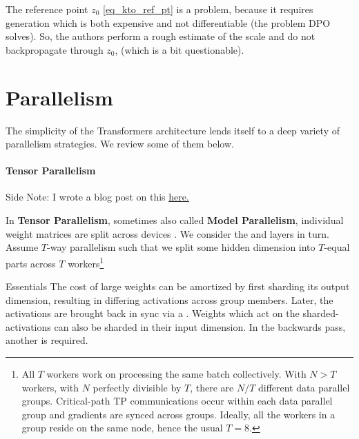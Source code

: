 \documentclass[11pt]{article}
\begin{document}
The reference point $ z _{ 0 } $ \eqref{eq_kto_ref_pt} is a problem, because it requires generation
which is both expensive and not differentiable (the problem DPO solves). So, the authors perform a
rough estimate of the scale and do not backpropagate through $ z _{ 0 } $, (which is a bit
questionable).


\newpage
\part{Parallelism}

The simplicity of the Transformers architecture lends itself to a deep variety of parallelism
strategies. We review some of them below.

\subsection{Tensor Parallelism \label{subsec_tensor_parallelism} }

\begin{commentbox}{Side Note: }
    I wrote a blog post on this \href{https://www.determined.ai/blog/tp}{here.}
\end{commentbox}


In \textbf{Tensor Parallelism}, sometimes also called \textbf{Model Parallelism}, individual weight
matrices are split across devices \cite{shoeybi2020megatronlm}. We consider the  and
 layers in turn. Assume $ T $-way parallelism such that we split some
hidden dimension into $ T $-equal parts across $ T $ workers\footnote{All $ T $ workers work on
    processing the same batch collectively.  With $ N>T $ workers, with $ N $ perfectly divisible by
    $ T $, there are $ N/T $ different data parallel groups. Critical-path TP communications occur
    within each data parallel group and gradients are synced across groups. Ideally, all the workers
    in a group reside on the same node, hence the usual $ T=8 $.}


\begin{nicebox}{Essentials}
	The cost of large weights can be amortized by first sharding its output dimension, resulting in
	differing activations across group members. Later, the activations are brought back in sync via
	a . Weights which act on the sharded-activations can also be sharded in their
	input dimension. In the backwards pass, another  is required.
\end{nicebox}
\end{document}

